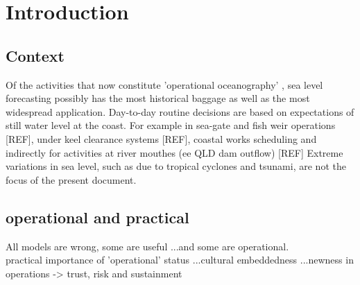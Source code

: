 \documentclass[jmse,article,submit,moreauthors,pdftex,10pt,a4paper]{mdpi}
\begin{document}

\section{Introduction}

\subsection{Context}

Of the activities that now constitute 'operational oceanography' \cite{Bell:2009uv}, sea level forecasting possibly has the most historical baggage as well as the most widespread application.
Day-to-day routine decisions are based on expectations of still water level \cite{Pugh:2014vf} at the coast.  
For example in sea-gate and fish weir operations [REF], under keel clearance systems [REF], coastal works scheduling and indirectly for activities at river mouthes (ee QLD dam outflow) [REF] 
Extreme variations in sea level, such as due to tropical cyclones and tsunami, are not the focus of the present document.


\subsection{operational and practical}
All models are wrong, some are useful ...and some are operational.\\


practical importance of 'operational' status
 ...cultural embeddedness 
...newness in operations -> trust, risk and sustainment\\
\end{document}
